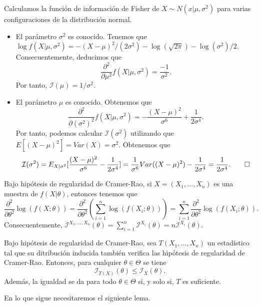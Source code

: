 \documentclass{article}
\begin{document}
    \begin{ex}
        Calculamos la función de información de Fisher de $X \sim N(x|\mu, \sigma^2)$ para varias configuraciones de la distribución normal.
        \begin{itemize}
            \item El parámetro $\sigma^2$ es conocido. Tenemos que $\log f(X|\mu, \sigma^2) = - (X-\mu)^2 / (2\sigma^2) - \log(\sqrt{2\pi}) - \log(\sigma^2)/2$. Consecuentemente, deducimos que \[\frac{\partial^2}{\partial\mu^2} f(X|\mu,\sigma^2) = \frac{-1}{\sigma^2}.\]
            Por tanto, $\mathcal{I}(\mu) = 1 / \sigma^2$.
            \item El parámetro $\mu$ es conocido. Obtenemos que
            \[\frac{\partial^2}{\partial(\sigma^2)^2} f(X|\mu,\sigma^2) = -\frac{(X-\mu)^2}{\sigma^6} + \frac{1}{2\sigma^4}.\]
            Por tanto, podemos calcular $\mathcal{I}(\sigma^2)$ utilizando que $E[(X-\mu)^2] = Var(X) = \sigma^2$. Obtenemos que
            \[\mathcal{I}(\sigma^2) = E_{X|\sigma^2}[\frac{(X-\mu)^2}{\sigma^6} - \frac{1}{2\sigma^4}] = \frac{1}{\sigma^6} Var((X-\mu)^2) - \frac{1}{2\sigma^4} = \frac{1}{2\sigma^4}. \qedhere\]
        \end{itemize}
    \end{ex}

    \begin{remark}
        Bajo hipótesis de regularidad de Cramer-Rao, si $X=(X_1, \ldots, X_n)$ es una muestra de $f(X|\theta)$, entonces tenemos que
        \[\frac{\partial^2}{\partial \theta^2}\log(f(X;\theta)) = \frac{\partial^2}{\partial \theta^2} \left(\sum_{i = 1}^n \log(f(X_i;\theta))\right) = \sum_{i = 1}^n \frac{\partial^2}{\partial \theta^2}\log(f(X_i;\theta)).\]
        Consecuentemente, $\mathcal{I}^{X_1, \ldots, X_n}(\theta) = \sum_{i = 1}^n \mathcal{I}^{X_i}(\theta) = n \mathcal{I}^{X_i}(\theta)$.
    \end{remark}

    \begin{lem}
        Bajo hipótesis de regularidad de Cramer-Rao, sea $T(X_1, \ldots, X_n)$ un estadístico tal que su ditribución inducida también verifica las hipótesis de regularidad de Cramer-Rao. Entonces, para cualquier $\theta \in \Theta$ se tiene
        \[\mathcal{I}_{T(X)}(\theta) \le \mathcal{I}_{X}(\theta).\]
        Además, la igualdad se da para todo $\theta \in \Theta$ si, y solo si, $T$ es suficiente.
    \end{lem}

    En lo que sigue necesitaremos el siguiente lema.
\end{document}
